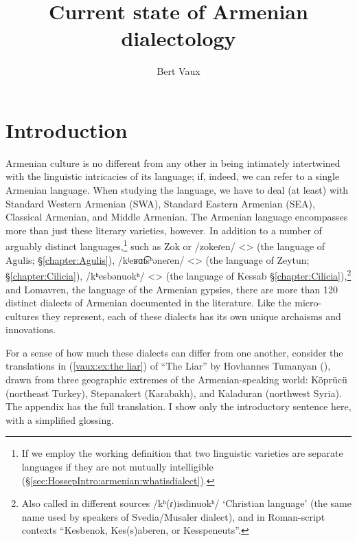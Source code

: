 \documentclass[output=paper]{langscibook}
\title{Current state of Armenian dialectology}
\author{Bert Vaux\affiliation{University of Cambridge}}
\begin{document}
\maketitle\label{chapter:Vaux}
\section{Introduction}\label{sec:vaux:intro}


Armenian culture is no different from any other in being intimately intertwined with the linguistic intricacies of its language; if, indeed, we can refer to a single Armenian language. When studying the language, we have to deal (at least) with Standard Western Armenian (SWA), Standard Eastern Armenian (SEA), Classical Armenian, and Middle Armenian.  The Armenian language encompasses more than just these literary varieties, however.  In addition to a number of arguably distinct languages,\footnote{If we employ the working definition that two linguistic varieties are separate languages if they are not mutually intelligible (\S\ref{sec:HossepIntro:armenian:whatisdialect}).  } such as   Zok or /zokeɾen/ <> (the language of Agulis; \S\ref{chapter:Agulis}),  /kʲeʁɑt͡sʰǝneɾen/ <> (the language of Zeytun; \S\ref{chapter:Cilicia}),  /kʰesbǝnuokʰ/ <> (the language of Kessab \S\ref{chapter:Cilicia}),\footnote{Also called in different sources /kʰ(ɾ)isdinuokʰ/ `Christian language' (the same name used by speakers of Svedia/Musaler dialect), and in Roman-script contexts ``Kesbenok,  Kes(s)aberen, or Kesspeneuts''.} and Lomavren, the language of the Armenian gypsies, there are more than 120 distinct dialects of Armenian documented in the literature.  Like the micro-cultures they represent, each of these dialects has its own unique archaisms and innovations.  

For a sense of how much these dialects can differ from one another, consider the translations in (\ref{vaux:ex:the liar}) of ``The Liar'' by Hovhannes Tumanyan (),  drawn from three geographic extremes of the Armenian\hyp speaking world: Köprücü (northeast Turkey), Stepanakert (Karabakh), and Kaladuran (northwest Syria). The appendix has the full translation. I show only the introductory sentence here, with a simplified glossing. 
\end{document}
